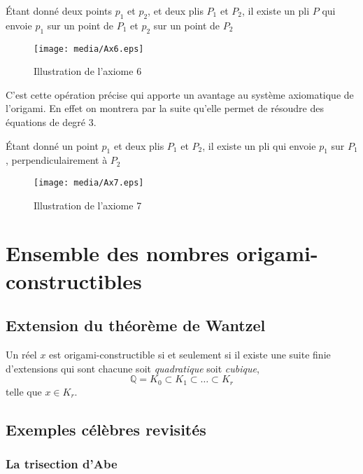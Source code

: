 \documentclass[a4paper,12pt,french,draft]{report}
\begin{document}
		
		\begin{axiome}
			Étant donné deux points $p_{1}$ et $p_{2}$, et deux plis $P_{1}$ et $P_{2}$, il existe un pli $P$ qui envoie $p_{1}$ sur un point de $P_{1}$ et $p_{2}$ sur un point de $P_{2}$
		\end{axiome}
		\begin{figure}[h]
		    \begin{center}
			\texttt{[image: media/Ax6.eps]}
		    \end{center}
			\caption{Illustration de l'axiome 6}
		\end{figure}
		 C'est cette opération précise qui apporte un avantage au système axiomatique de l'origami. En effet on montrera par la suite qu'elle permet de résoudre des équations de degré 3.
		
		
		\begin{axiome}
			Étant donné un point $p_{1}$ et deux plis $P_{1}$ et $P_{2}$, il existe un pli qui envoie $p_{1}$ sur $P_{1}$, perpendiculairement à $P_{2}$
		\end{axiome}
		\begin{figure}[h]
		    \begin{center}
			\texttt{[image: media/Ax7.eps]}
		    \end{center}
			\caption{Illustration de l'axiome 7}
		\end{figure}
	
	\section{Ensemble des nombres origami-constructibles}
	
	\subsection{Extension du théorème de Wantzel}
		\begin{theorem}
			Un réel \( x \) est origami-constructible si et seulement si il existe une suite finie d'extensions qui sont chacune soit \emph{quadratique} soit \emph{cubique},
					\[
					\mathbb{Q} = K_0 \subset K_1 \subset \dots \subset K_r
					\]
			telle que \( x \in K_r \).
		\end{theorem}
	
	\subsection{Exemples célèbres revisités}
		\subsubsection{La trisection d'Abe}
\end{document}

